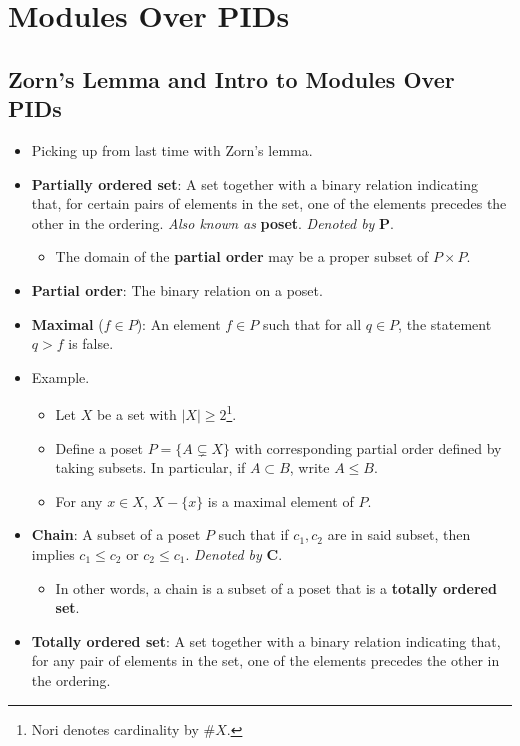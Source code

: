\documentclass[../notes.tex]{subfiles}
\begin{document}
\chapter{Modules Over PIDs}
\section{Zorn's Lemma and Intro to Modules Over PIDs}
\begin{itemize}
    \item {}Picking up from last time with Zorn's lemma.
    \item \textbf{Partially ordered set}: A set together with a binary relation indicating that, for certain pairs of elements in the set, one of the elements precedes the other in the ordering. \emph{Also known as} \textbf{poset}. \emph{Denoted by} $\bm{P}$.
    \begin{itemize}
        \item The domain of the \textbf{partial order} may be a proper subset of $P\times P$.
    \end{itemize}
    \item \textbf{Partial order}: The binary relation on a poset.
    \item \textbf{Maximal} ($f\in P$): An element $f\in P$ such that for all $q\in P$, the statement $q>f$ is false.
    \item Example.
    \begin{itemize}
        \item Let $X$ be a set with $|X|\geq 2$\footnote{Nori denotes cardinality by $\#X$.}.
        \item Define a poset $P=\{A\subsetneq X\}$ with corresponding partial order defined by taking subsets. In particular, if $A\subset B$, write $A\leq B$.
        \item For any $x\in X$, $X-\{x\}$ is a maximal element of $P$.
    \end{itemize}
    \item \textbf{Chain}: A subset of a poset $P$ such that if $c_1,c_2$ are in said subset, then implies $c_1\leq c_2$ or $c_2\leq c_1$. \emph{Denoted by} $\bm{C}$.
    \begin{itemize}
        \item In other words, a chain is a subset of a poset that is a \textbf{totally ordered set}.
    \end{itemize}
    \item \textbf{Totally ordered set}: A set together with a binary relation indicating that, for any pair of elements in the set, one of the elements precedes the other in the ordering.

\end{itemize}
\end{document}
